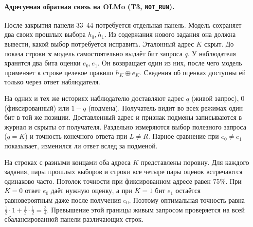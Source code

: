 \paragraph{Адресуемая обратная связь на OLMo (T3, \texttt{NOT\_RUN}).}
После закрытия панели 33--44 потребуется отдельная панель. Модель сохраняет два своих прошлых выбора $h_0,h_1$. Из содержания нового задания она должна вывести, какой выбор потребуется исправить. Эталонный адрес $K$ скрыт. До показа строки $\mathbf{x}$ модель самостоятельно выдаёт бит запроса $q$. У наблюдателя хранятся два бита оценки $e_0,e_1$. Он возвращает один из них, после чего модель применяет к строке целевое правило $h_K\oplus e_K$. Сведения об оценках доступны ей только через ответ наблюдателя.

На одних и тех же историях наблюдателю доставляют адрес $q$ (живой запрос), $0$ (фиксированный) или $1-q$ (подмена). Получатель видит во всех режимах один бит в той же позиции. Доставленный адрес и признак подмены записываются в журнал и скрыты от получателя. Раздельно измеряются выбор полезного запроса ($q=K$) и точность конечного ответа при $L\ne R$. Парное сравнение при $e_0\ne e_1$ показывает, изменился ли ответ вслед за подменой.

На строках с разными концами оба адреса $K$ представлены поровну. Для каждого задания, пары прошлых выборов и строки все четыре пары оценок встречаются одинаково часто. Потолок точности при фиксированном адресе равен $75\%$. При $K=0$ ответ $e_0$ даёт нужную оценку, а при $K=1$ бит $e_1$ остаётся равновероятным даже после получения $e_0$. Поэтому оптимальная точность равна $\tfrac12\cdot1+\tfrac12\cdot\tfrac12=\tfrac34$. Превышение этой границы живым запросом проверяется на всей сбалансированной панели различающих строк.

